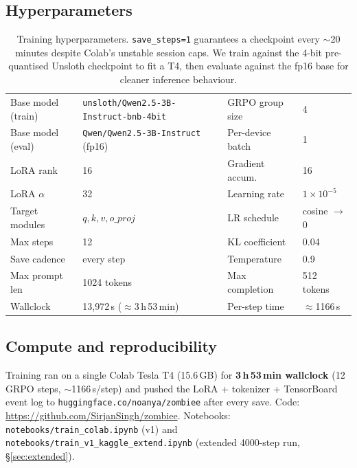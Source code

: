\documentclass[11pt,a4paper]{article}
\begin{document}
\subsection{Hyperparameters}
\begin{table}[h]
  \centering\small
  \begin{tabular}{ll|ll}
    \toprule
    Base model (train) & \texttt{unsloth/Qwen2.5-3B-Instruct-bnb-4bit} & GRPO group size & 4 \\
    Base model (eval)  & \texttt{Qwen/Qwen2.5-3B-Instruct} (fp16)      & Per-device batch & 1 \\
    LoRA rank          & 16                          & Gradient accum.  & 16 \\
    LoRA $\alpha$     & 32                          & Learning rate    & $1\!\times\!10^{-5}$ \\
    Target modules    & $q,k,v,o\_proj$             & LR schedule      & cosine $\rightarrow$ 0 \\
    Max steps         & 12                          & KL coefficient   & 0.04 \\
    Save cadence      & every step                  & Temperature      & 0.9 \\
    Max prompt len    & 1024 tokens                 & Max completion   & 512 tokens \\
    Wallclock         & 13{,}972\,s ($\approx$3\,h\,53\,min) & Per-step time & $\approx$1166\,s \\
    \bottomrule
  \end{tabular}
  \caption{Training hyperparameters. \texttt{save\_steps=1} guarantees a
           checkpoint every $\sim$20 minutes despite Colab's unstable
           session caps. We train against the 4-bit pre-quantised Unsloth
           checkpoint to fit a T4, then evaluate against the fp16 base
           for cleaner inference behaviour.}
\end{table}

\subsection{Compute and reproducibility}
Training ran on a single Colab Tesla T4 (15.6\,GB) for
\textbf{3\,h\,53\,min wallclock} (12 GRPO steps, $\sim$1166\,s/step) and
pushed the LoRA + tokenizer + TensorBoard event log to
\texttt{huggingface.co/noanya/zombiee} after every save. Code:
\url{https://github.com/SirjanSingh/zombiee}. Notebooks:
\texttt{notebooks/train\_colab.ipynb} (v1) and
\texttt{notebooks/train\_v1\_kaggle\_extend.ipynb} (extended 4000-step run, §\ref{sec:extended}).
\end{document}
